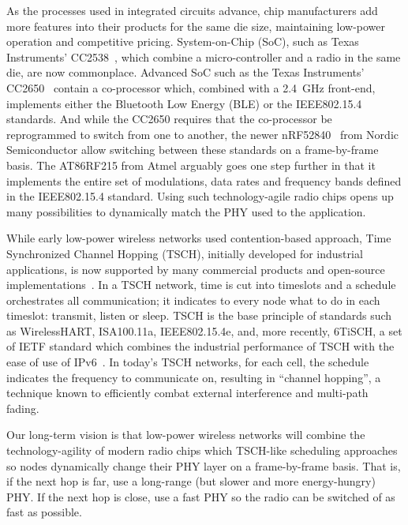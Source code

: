 \documentclass[sensors,article,submit,moreauthors,pdftex]{Definitions/mdpi}
\begin{document}
As the processes used in integrated circuits advance, chip manufacturers add more features into their products for the same die size,
    maintaining low-power operation and
    competitive pricing.
System-on-Chip (SoC), such as Texas Instruments' CC2538~\cite{datasheet_cc2538}, which combine a micro-controller and a radio in the same die, are now commonplace.
Advanced SoC such as the Texas Instruments' CC2650~\cite{datasheet_cc2650} contain a co-processor which, combined with a 2.4~GHz front-end, implements either the Bluetooth Low Energy (BLE) or the IEEE802.15.4 standards.
And while the CC2650 requires that the co-processor be reprogrammed to switch from one to another,
    the newer nRF52840~\cite{datasheet_nrf52840} from Nordic Semiconductor allow switching between these standards on a frame-by-frame basis.
The AT86RF215 from Atmel arguably goes one step further in that it implements the entire set of modulations, data rates and frequency bands defined in the IEEE802.15.4 standard.
Using such technology-agile radio chips opens up many possibilities to dynamically match the PHY used to the application.


While early low-power wireless networks used contention-based approach,
    Time Synchronized Channel Hopping (TSCH), initially developed for industrial applications,
    is now supported by many commercial products and open-source implementations~\cite{watteyne16industrial}.
In a TSCH network, time is cut into timeslots and a schedule orchestrates all communication;
    it indicates to every node what to do in each timeslot: transmit, listen or sleep.
TSCH is the base principle of standards such as WirelessHART, ISA100.11a, IEEE802.15.4e, and, more recently, 6TiSCH, a set of IETF standard which combines the industrial performance of TSCH with the ease of use of IPv6~\cite{draft-ietf-6tisch-msf}.
In today's TSCH networks, for each cell, the schedule indicates the frequency to communicate on, resulting in ``channel hopping'', a technique known to efficiently combat external interference and multi-path fading.


Our long-term vision is that low-power wireless networks will combine the technology-agility of modern radio chips which TSCH-like scheduling approaches so nodes dynamically change their PHY layer on a frame-by-frame basis.
That is, if the next hop is far,   use a long-range (but slower and more energy-hungry) PHY.
         If the next hop is close, use a fast PHY so the radio can be switched of as fast as possible.
\end{document}
